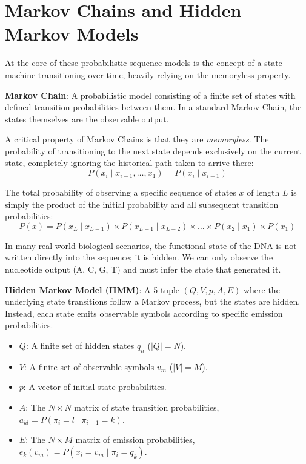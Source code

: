 \section{Markov Chains and Hidden Markov Models}

At the core of these probabilistic sequence models is the concept of a state machine transitioning over time, heavily relying on the memoryless property.

\begin{important}
  \textbf{Markov Chain}: A probabilistic model consisting of a finite set of states with defined transition probabilities between them.
  In a standard Markov Chain, the states themselves are the observable output.
\end{important}

\sta A critical property of Markov Chains is that they are \textit{memoryless}. The probability of transitioning to the next state depends exclusively on the current state, completely ignoring the historical path taken to arrive there:
\begin{equation}
  P(x_i \mid x_{i-1}, \dots, x_1) = P(x_i \mid x_{i-1})
\end{equation}

The total probability of observing a specific sequence of states $x$ of length $L$ is simply the product of the initial probability and all subsequent transition probabilities:
\[
  P(x) = P(x_L \mid x_{L-1}) \times P(x_{L-1} \mid x_{L-2}) \times \dots \times P(x_2 \mid x_1) \times P(x_1)
\]

In many real-world biological scenarios, the functional state of the DNA is not written directly into the sequence; it is hidden. We can only observe the nucleotide output (A, C, G, T) and must infer the state that generated it.

\begin{important}
  \textbf{Hidden Markov Model (HMM)}: A 5-tuple $(Q, V, p, A, E)$ where the underlying state transitions follow a Markov process, but the states are hidden. Instead, each state emits observable symbols according to specific emission probabilities.
  \begin{itemize}
      \item $Q$: A finite set of hidden states $q_n$ ($|Q| = N$).
      \item $V$: A finite set of observable symbols $v_m$ ($|V| = M$).
      \item $p$: A vector of initial state probabilities.
      \item $A$: The $N \times N$ matrix of state transition probabilities, $a_{kl} = P(\pi_i = l \mid \pi_{i-1} = k)$.
      \item $E$: The $N \times M$ matrix of emission probabilities, $e_k(v_m) = P(x_i = v_m \mid \pi_i = q_k)$.
  \end{itemize}
\end{important}

